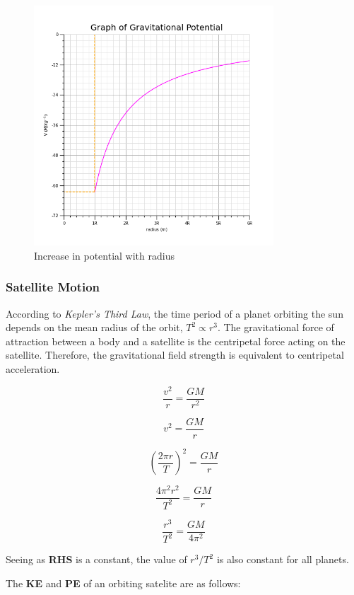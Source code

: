 \documentclass[12pt]{article}
\begin{document}
\begin{figure}[H]
\centering
\includegraphics[width=0.8\textwidth,keepaspectratio]{./images/gravitational_potential.png}
\caption{Increase in potential with radius}
\end{figure}

\subsubsection{Satellite Motion}
\label{sec:org0727850}

According to \emph{Kepler's Third Law}, the time period of a planet orbiting the sun depends on the mean radius of the orbit,  \(T^2 \propto r^3\). The gravitational force of attraction between a body and a satellite is the centripetal force acting on the satellite. Therefore, the gravitational field strength is equivalent to centripetal acceleration.

\[\dfrac{v^2}{r} = \dfrac{GM}{r^2}\]

\[v^2 = \dfrac{GM}{r}\]

\[\left (\dfrac{2 \pi r}{T} \right )^2 = \dfrac{GM}{r}\]

\[\dfrac{4 \pi^2 r^2}{T^2} = \dfrac{GM}{r}\]

\[\dfrac{r^3}{T^2} = \dfrac{GM}{4 \pi^2 }\]

Seeing as \textbf{RHS} is a constant, the value of \(r^3/T^2\) is also constant for all planets.

The \textbf{KE} and \textbf{PE} of an orbiting satelite are as follows:
\end{document}
